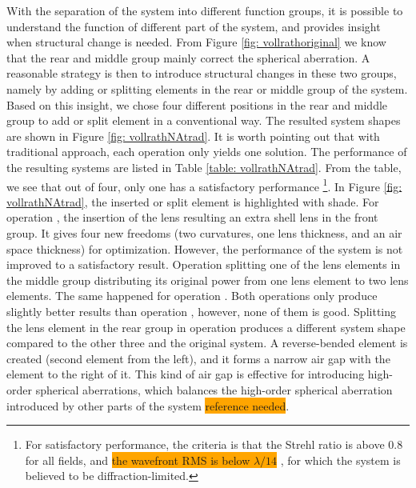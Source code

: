 With the separation of the system into different function groups, it is possible to understand the function of different part of the system, and provides insight when structural change is needed. From Figure \ref{fig: vollrathoriginal} we know that the rear and middle group mainly correct the spherical aberration. A reasonable strategy is then to introduce structural changes in these two groups, namely by adding or splitting elements in the rear or middle group of the system. Based on this insight, we chose four different positions in the rear and middle group to add or split element in a conventional way. The resulted system shapes are shown in Figure \ref{fig: vollrathNAtrad}. It is worth pointing out that with traditional approach, each operation only yields one solution. The performance of the resulting systems are listed in Table \ref{table: vollrathNAtrad}. From the table, we see that out of four, only one has a satisfactory performance \footnote{For satisfactory performance, the criteria is that the Strehl ratio is above 0.8 for all fields, and \colorbox{orange}{the wavefront RMS is below $\lambda/14$} \cite{patentvollrath}, for which the system is believed to be diffraction-limited.}. In Figure \ref{fig: vollrathNAtrad}, the inserted or split element is highlighted with shade. For operation , the insertion of the lens resulting an extra shell lens in the front group. It gives four new freedoms (two curvatures, one lens thickness, and an air space thickness) for optimization. However, the performance of the system is not improved to a satisfactory result. Operation  splitting one of the lens elements in the middle group distributing its original power from one lens element to two lens elements. The same happened for operation . Both operations only produce slightly better results than operation , however, none of them is good. Splitting the lens element in the rear group in operation  produces a different system shape compared to the other three and the original system. A reverse-bended element is created (second element from the left), and it forms a narrow air gap with the element to the right of it. This kind of air gap is effective for introducing high-order spherical aberrations, which balances the high-order spherical aberration introduced by other parts of the system \colorbox{orange}{reference needed}. 

